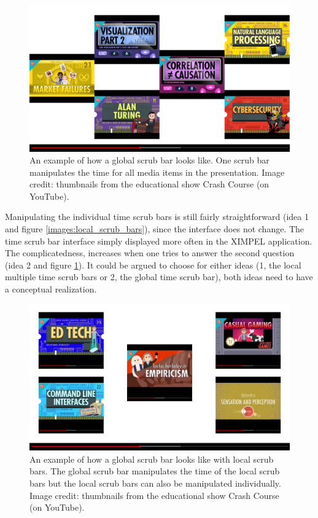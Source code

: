 \begin{figure}
\centering
\includegraphics[width=1.35\textwidth, center]{images/global_scrub_bar_only.png} %
\caption{An example of how a global scrub bar looks like. One scrub bar manipulates the time for all media items in the presentation. Image credit: thumbnails from the educational show Crash Course (on YouTube).}
\label{images:global_scrub_bar_only}
\end{figure}

Manipulating the individual time scrub bars is still fairly straightforward (idea 1 and figure \ref{images:local_scrub_bars}), since the interface does not change. The time scrub bar interface simply displayed more often in the XIMPEL application. The complicatedness, increases when one tries to answer the second question (idea 2 and figure \ref{images:global_scrub_bar_only}). It could be argued to choose for either ideas (1, the local multiple time scrub bars or 2, the global time scrub bar), both ideas need to have a conceptual realization.

\begin{figure}
\centering
\includegraphics[width=1.35\textwidth, center]{images/global_scrub_bar_with_locals.png} %
\caption{An example of how a global scrub bar looks like with local scrub bars. The global scrub bar manipulates the time of the local scrub bars but the local scrub bars can also be manipulated individually. Image credit: thumbnails from the educational show Crash Course (on YouTube).}
\label{images:global_scrub_bar_with_locals}
\end{figure}

